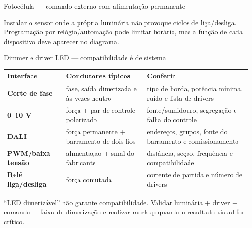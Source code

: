 \begin{frame}{Fotocélula — comando externo com alimentação permanente}
\centering
{}
\begin{caixaObs}
Instalar o sensor onde a própria luminária não provoque ciclos de liga/desliga. Programação por relógio/automação pode limitar horário, mas a função de cada dispositivo deve aparecer no diagrama.
\end{caixaObs}
\end{frame}

\begin{frame}{Dimmer e driver LED — compatibilidade é de sistema}
\scriptsize
\begin{tabularx}{\textwidth}{>{\bfseries}p{2.6cm}X X}
\toprule
Interface & Condutores típicos & Conferir \\
\midrule
Corte de fase & fase, saída dimerizada e às vezes neutro & tipo de borda, potência mínima, ruído e lista de drivers \\
0--10 V & força + par de controle polarizado & fonte/sumidouro, segregação e falha do controle \\
DALI & força permanente + barramento de dois fios & endereços, grupos, fonte do barramento e comissionamento \\
PWM/baixa tensão & alimentação + sinal do fabricante & distância, seção, frequência e compatibilidade \\
Relé liga/desliga & força comutada & corrente de partida e número de drivers \\
\bottomrule
\end{tabularx}
\begin{caixaAt}
“LED dimerizável” não garante compatibilidade. Validar luminária + driver + comando + faixa de dimerização e realizar mockup quando o resultado visual for crítico.
\end{caixaAt}
\end{frame}

